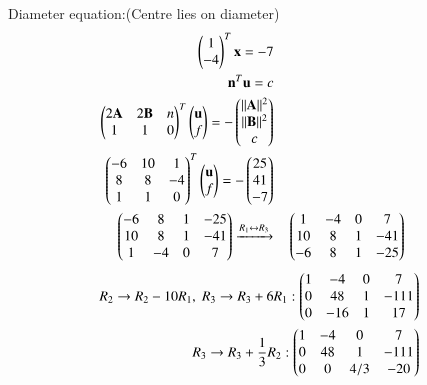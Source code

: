 \documentclass[journal]{article}
\begin{document}
Diameter equation:(Centre lies on diameter)
\begin{align}
\begin{pmatrix}1 \\ -4\end{pmatrix}^T\mathbf{x}=-7\\
\mathbf{n}^T\mathbf{u}=c\\
\begin{pmatrix}2\mathbf{A} & 2\mathbf{B} & n \\ 1 & 1 & 0\end{pmatrix}^T\begin{pmatrix}\mathbf{u}\\f\end{pmatrix}=-\begin{pmatrix}||\mathbf{A}||^2\\||\mathbf{B}||^2\\c\end{pmatrix}\\
\begin{pmatrix}-6 & 10 & 1  \\
8 & 8 & -4 \\
1 & 1 & 0 \end{pmatrix}^T\begin{pmatrix}\mathbf{u}\\f\end{pmatrix} = -\begin{pmatrix}25 \\ 41 \\ -7\end{pmatrix}\\
\begin{pmatrix}
-6 & 8 & 1 & -25 \\
10 & 8 & 1 & -41 \\
1 & -4 & 0 & 7
\end{pmatrix}
\xrightarrow{ R_1 \leftrightarrow R_3} & \quad
\begin{pmatrix}
1 & -4 & 0 & 7 \\
10 & 8 & 1 & -41 \\
-6 & 8 & 1 & -25
\end{pmatrix} 
\end{align}
\begin{align}
R_2 \to R_2 - 10R_1, \; R_3 \to R_3 + 6 R_1 :
 \begin{pmatrix}
1 & -4 & 0 & 7 \\
0 & 48 & 1 & -111 \\
0 & -16 & 1 & 17
\end{pmatrix} \\
R_3 \to R_3 + \frac{1}{3} R_2 :
 \begin{pmatrix}
1 & -4 & 0 & 7 \\
0 & 48 & 1 & -111 \\
0 & 0 & 4/3 & -20
\end{pmatrix}
\end{align}
\end{document}
